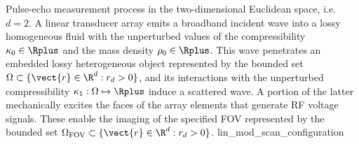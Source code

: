 %
{%
 Pulse-echo measurement process in
 the two-dimensional Euclidean space, i.e. $d = 2$.
 A linear transducer array emits
 a broadband incident wave into
 a lossy homogeneous fluid with
 the unperturbed values of
 the compressibility
 $\kappa_{0} \in \Rplus$ and
 the mass density
 $\rho_{0} \in \Rplus$.
 This wave penetrates
 an embedded lossy heterogeneous object represented by
 the bounded set
 $\Omega \subset \{ \vect{r} \in \R^{d}: r_{d} > 0 \}$, and
 its interactions with
 the unperturbed compressibility
 $\kappa_{1}: \Omega \mapsto \Rplus$ induce
 a scattered wave.
 A portion of
 the latter mechanically excites
 the faces of
 the array elements that generate
 \ac{RF} voltage signals.
 These enable
 the imaging of
 the specified \ac{FOV} represented by
 the bounded set
 $\Omega_{\text{FOV}} \subset \{ \vect{r} \in \R^{d}: r_{d} > 0 \}$.
}%
{lin_mod_scan_configuration}

